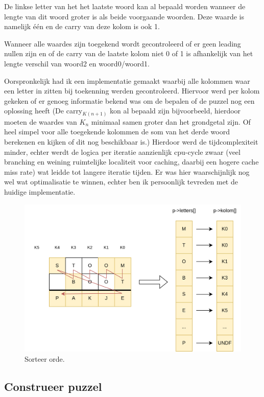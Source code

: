 \documentclass[twocolumn,10pt]{article}
\begin{document}
De linkse letter van het het laatste woord kan al bepaald worden wanneer de lengte van dit woord groter is als beide voorgaande woorden. Deze waarde is namelijk \'e\'en en de carry van deze kolom is ook 1.

Wanneer alle waardes zijn toegekend wordt gecontroleerd of er geen leading nullen zijn en of de carry van de laatste kolom niet 0 of 1 is afhankelijk van het lengte verschil van woord2 en woord0/woord1.

Oorspronkelijk had ik een implementatie gemaakt waarbij alle kolommen waar een letter in zitten bij toekenning werden gecontroleerd. Hiervoor werd per kolom gekeken of er genoeg informatie bekend was om de bepalen of de puzzel nog een oplossing heeft (De carry$_{K(n+1)}$ kon al bepaald zijn bijvoorbeeld, hierdoor moeten de waardes van $K_n$ minimaal samen groter dan het grondgetal zijn. Of heel simpel voor alle toegekende kolommen de som van het derde woord berekenen en kijken of dit nog beschikbaar is.) Hierdoor werd de tijdcomplexiteit minder, echter werdt de logica per iteratie aanzienlijk cpu-cycle zwaar (veel branching en weining ruimtelijke localiteit voor caching, daarbij een hogere cache miss rate) wat leidde tot langere iteratie tijden. Er was hier waarschijnlijk nog wel wat optimalisatie te winnen, echter ben ik persoonlijk tevreden met de huidige implementatie.

\begin{figure}[H]
    \centering
    \includegraphics[width=1.0\columnwidth]{letter.png}
        \caption{Sorteer orde.}
    \end{figure}
    \hfill


\subsection*{Construeer puzzel}
\end{document}
